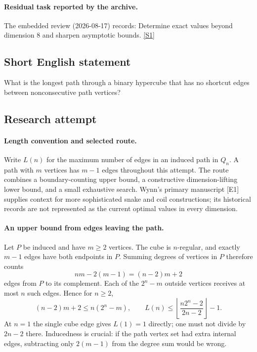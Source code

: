 \documentclass[11pt,a4paper]{article}
\newcommand{\sref}[2]{\hyperlink{source:#1:#2}{[S#2]}}
\begin{document}
\paragraph{Residual task reported by the archive.}

The embedded review (2026-08-17) records: Determine exact values beyond dimension 8 and sharpen asymptotic bounds. \sref{1423}{1}

\subsection{Short English statement}

What is the longest path through a binary hypercube that has no shortcut edges between nonconsecutive path vertices?

\subsection{Research attempt}

\paragraph{Length convention and selected route.}
Write $L(n)$ for the maximum number of edges in an induced path in
$Q_n$. A path with $m$ vertices has $m-1$ edges throughout this attempt.
The route combines a boundary-counting upper bound, a constructive
dimension-lifting lower bound, and a small exhaustive search. Wynn's
primary manuscript [E1] supplies context for more sophisticated snake
and coil constructions; its historical records are not represented as
the current optimal values in every dimension.

\paragraph{An upper bound from edges leaving the path.}
Let $P$ be induced and have $m\ge2$ vertices. The cube is $n$-regular,
and exactly $m-1$ edges have both endpoints in $P$. Summing degrees
of vertices in $P$ therefore counts
\[
                     nm-2(m-1)=(n-2)m+2
\]
edges from $P$ to its complement. Each of the $2^n-m$ outside
vertices receives at most $n$ such edges. Hence for $n\ge2$,
\[
 (n-2)m+2\le n(2^n-m),\qquad
 L(n)\le\left\lfloor\frac{n2^n-2}{2n-2}\right\rfloor-1.
\]
At $n=1$ the single cube edge gives $L(1)=1$ directly; one must not
divide by $2n-2$ there. Inducedness is crucial: if the path vertex
set had extra internal edges, subtracting only $2(m-1)$ from the
degree sum would be wrong.
\end{document}
